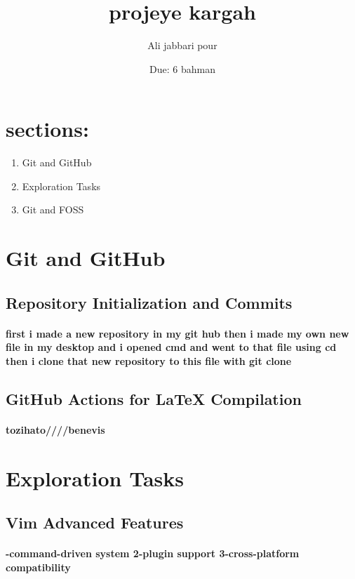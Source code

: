 \documentclass[titlepage]{article}
\title{projeye kargah}
\author{Ali jabbari pour}
\date{Due: 6 bahman}
\begin{document}
\maketitle
\tableofcontents
\newpage
\section{sections:}
\begin{enumerate}
    \item Git and GitHub
    \item Exploration Tasks
    \item Git and FOSS
\end{enumerate}
\fancyhead[L]{\thepage}
\newpage
\section{Git and GitHub}
\subsection{Repository Initialization and Commits}
\paragraph{\selectfont first i made a new repository in my git hub then i made my own new file in my
 desktop and i opened cmd and went to that file using cd then i clone that new repository to this file with git clone}
 \subsection{GitHub Actions for LaTeX Compilation }
 \paragraph{\selectfont tozihato////benevis}
 \section{Exploration Tasks}
 \subsection{Vim Advanced Features}
 \paragraph{-command-driven system 2-plugin support 3-cross-platform compatibility}
\end{document}
